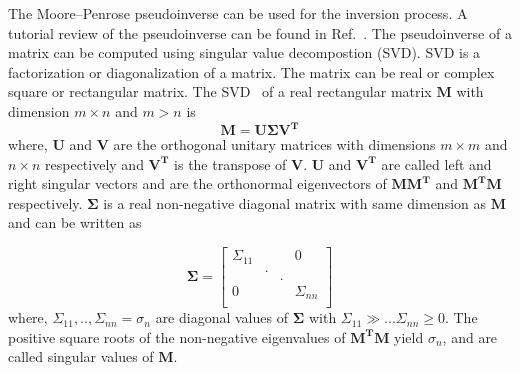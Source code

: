 The Moore--Penrose pseudoinverse can be used for the inversion process. A tutorial review of the pseudoinverse can be found in Ref.~\cite{pseudo}. The pseudoinverse of a matrix can be computed using singular value decompostion (SVD). SVD is a factorization or diagonalization of a matrix. The matrix can be real or complex square or rectangular matrix. The SVD~\cite{svd4,svd2,svd3} of a real rectangular matrix $\bm{M}$ with dimension $m \times n$ and $m>n$ is 
\begin{equation}\label{eq:m}
    \bm{M} = \bm{U} \bm{\Sigma} \bm{V^T}
\end{equation}
where, $\bm{U}$ and $\bm{V}$ are the orthogonal unitary matrices with dimensions $m \times m$ and $n \times n$ respectively and $\bm{V^T}$ is the transpose of $\bm{V}$. $\bm{U}$ and $\bm{V^T}$ are called left and right singular vectors and are the orthonormal eigenvectors of $\bm{M}\bm{M^T}$ and $\bm{M^T}\bm{M}$ respectively. $\bm{\Sigma}$ is a real non-negative diagonal matrix with same dimension as  $\bm{M}$ and can be written as

\begin{equation*}
\bm{\Sigma} = \begin{bmatrix} 
\Sigma_{11} &  &  & 0 \\
  & . &  &  \\
  &   & . &  \\

0 &  &  & \Sigma_{nn} \\
 \end{bmatrix}
\end{equation*}
where, $\Sigma_{11},..,\Sigma_{nn}=\sigma_{n}$ are diagonal values of $\bm{\Sigma}$ with $\Sigma_{11}\gg... \Sigma_{nn}\geq0$. The positive square roots of the non-negative eigenvalues of $\bm{M^T}\bm{M}$ yield $\sigma_{n}$, and are called singular values of $\bm{M}$. 

